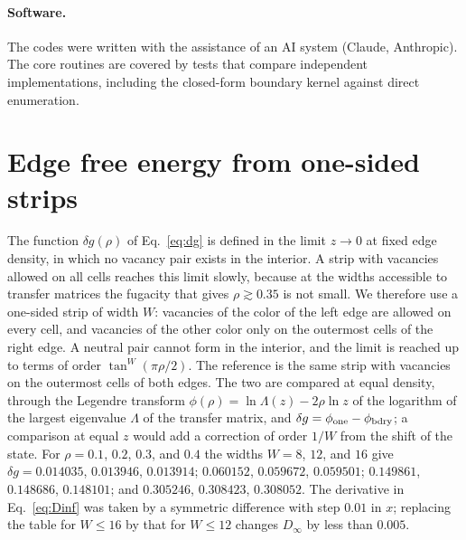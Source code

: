 \documentclass[reprint,aps,pre,superscriptaddress,longbibliography,floatfix,amsmath,amssymb]{revtex4-2}
\begin{document}
\paragraph*{Software.} The codes were written with the assistance of an AI system (Claude, Anthropic). The core routines are covered by tests that compare independent implementations, including the closed-form boundary kernel against direct enumeration.

\section{Edge free energy from one-sided strips}\label{app:dg}

The function $\delta g(\rho)$ of Eq.~\eqref{eq:dg} is defined in the limit $z\to0$ at fixed edge density, in which no vacancy pair exists in the interior. A strip with vacancies allowed on all cells reaches this limit slowly, because at the widths accessible to transfer matrices the fugacity that gives $\rho\gtrsim0.35$ is not small. We therefore use a one-sided strip of width $W$: vacancies of the color of the left edge are allowed on every cell, and vacancies of the other color only on the outermost cells of the right edge. A neutral pair cannot form in the interior, and the limit is reached up to terms of order $\tan^W(\pi\rho/2)$. The reference is the same strip with vacancies on the outermost cells of both edges. The two are compared at equal density, through the Legendre transform $\phi(\rho)=\ln\Lambda(z)-2\rho\ln z$ of the logarithm of the largest eigenvalue $\Lambda$ of the transfer matrix, and $\delta g=\phi_{\rm one}-\phi_{\rm bdry}$; a comparison at equal $z$ would add a correction of order $1/W$ from the shift of the state. For $\rho=0.1$, $0.2$, $0.3$, and $0.4$ the widths $W=8$, $12$, and $16$ give $\delta g=0.014035$, $0.013946$, $0.013914$; $0.060152$, $0.059672$, $0.059501$; $0.149861$, $0.148686$, $0.148101$; and $0.305246$, $0.308423$, $0.308052$. The derivative in Eq.~\eqref{eq:Dinf} was taken by a symmetric difference with step $0.01$ in $x$; replacing the table for $W\le16$ by that for $W\le12$ changes $D_\infty$ by less than $0.005$.
\end{document}
